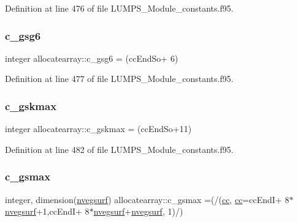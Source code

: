 Definition at line 476 of file L\+U\+M\+P\+S\+\_\+\+Module\+\_\+constants.\+f95.

\mbox{\label{namespaceallocatearray_ab8971a61a031605df883466bf12f9c11}} 
\subsubsection{\texorpdfstring{c\+\_\+gsg6}{c\_gsg6}}
{\footnotesize\ttfamily integer allocatearray\+::c\+\_\+gsg6 = (cc\+End\+So+ 6)}



Definition at line 477 of file L\+U\+M\+P\+S\+\_\+\+Module\+\_\+constants.\+f95.

\mbox{\label{namespaceallocatearray_a69cae8cc47b53e83d621a7abe318ff14}} 
\subsubsection{\texorpdfstring{c\+\_\+gskmax}{c\_gskmax}}
{\footnotesize\ttfamily integer allocatearray\+::c\+\_\+gskmax = (cc\+End\+So+11)}



Definition at line 482 of file L\+U\+M\+P\+S\+\_\+\+Module\+\_\+constants.\+f95.

\mbox{\label{namespaceallocatearray_a298574bfb3fe39217e94ca3a41541a29}} 
\subsubsection{\texorpdfstring{c\+\_\+gsmax}{c\_gsmax}}
{\footnotesize\ttfamily integer, dimension(\hyperlink{namespaceallocatearray_abb987c3b35dd321963fd53d38f10236f}{nvegsurf}) allocatearray\+::c\+\_\+gsmax =(/(\hyperlink{namespaceallocatearray_ac863c81704eb507dee10f5e10741e10c}{cc}, \hyperlink{namespaceallocatearray_ac863c81704eb507dee10f5e10741e10c}{cc}=cc\+EndI+ 8$\ast$\hyperlink{namespaceallocatearray_abb987c3b35dd321963fd53d38f10236f}{nvegsurf}+1,cc\+EndI+ 8$\ast$\hyperlink{namespaceallocatearray_abb987c3b35dd321963fd53d38f10236f}{nvegsurf}+\hyperlink{namespaceallocatearray_abb987c3b35dd321963fd53d38f10236f}{nvegsurf}, 1)/)}



